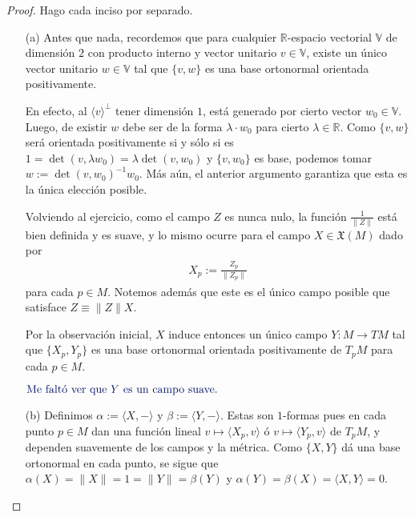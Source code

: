 \documentclass[11pt]{article}
\newcommand{\R}{\mathbb{R}}
\newcommand{\X}{\mathfrak{X}}
\newcommand{\ip}[1]{\langle #1 \rangle}
\newcommand{\paint}[1]{\color{color}{#1}}
\newcommand{\tpaing}[1]{\paint{\text{#1}}}
\begin{document}
\begin{proof} Hago cada inciso por separado.
\begin{itemize}[listparindent = \parindent]
\item[(a)] Antes que nada, recordemos que para cualquier $\R$-espacio vectorial $\mathbb{V}$ de dimensión $2$ con producto interno y vector unitario $v \in \mathbb{V}$, existe un único vector unitario $w \in \mathbb{V}$ tal que $\{v,w\}$ es una base ortonormal orientada positivamente. 

En efecto, al $\ip{v}^\perp$ tener dimensión $1$, está generado por cierto vector $w_0 \in \mathbb{V}$. Luego, de existir $w$ debe ser de la forma $\lambda \cdot w_0$ para cierto $\lambda \in \R$. Como $\{v,w\}$ será orientada positivamente si y sólo si es $1 = \det(v,\lambda w_0)= \lambda \det(v,w_0)$ y $\{v,w_0\}$ es base, podemos tomar $w := \det(v,w_0)^{-1}w_0$. Más aún, el anterior argumento garantiza que esta es la única elección posible.

Volviendo al ejercicio, como el campo $Z$ es nunca nulo, la función $\frac{1}{\|Z\|}$ está bien definida y es suave, y lo mismo ocurre para el campo $X \in \X(M)$ dado por
\begin{align*}
X_p := \frac{Z_p}{\|Z_p\|}
\end{align*}
para cada $p \in M$. Notemos además que este es el único campo posible que satisface $Z \equiv \|Z\|X$. 

Por la observación inicial, $X$ induce entonces un único campo $Y : M \to TM$ tal que $\{X_p,Y_p\}$ es una base ortonormal orientada positivamente de $T_pM$ para cada $p \in M$.
\begin{center}
$\tpaing{Me faltó ver que $Y$ es un campo suave.}$
\end{center}
\item[(b)] Definimos $\alpha := \ip{X,-}$ y $\beta := \ip{Y,-}$. Estas son $1$-formas pues en cada punto $p \in M$ dan una función lineal $v \mapsto \ip{X_p,v}$ ó $v \mapsto \ip{Y_p,v}$ de $T_pM$, y dependen suavemente de los campos y la métrica. Como $\{X,Y\}$ dá una base ortonormal en cada punto, se sigue que $\alpha(X) = \|X\| = 1 = \|Y\| = \beta(Y)$ y $\alpha(Y) = \beta(X) = \ip{X,Y} = 0$. 


\end{itemize}
\end{proof}
\end{document}
